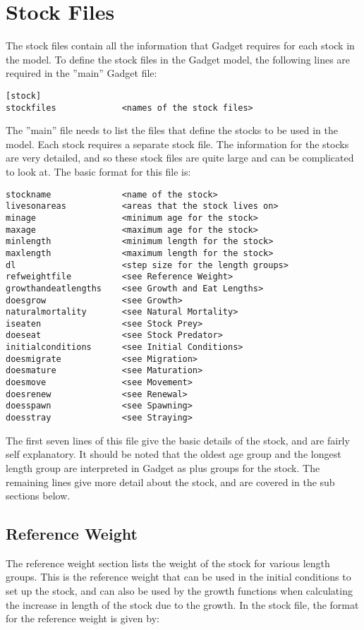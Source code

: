 \documentclass[10pt,twoside]{book}
\begin{document}
\chapter{Stock Files}\label{chap:stock}
The stock files contain all the information that Gadget requires for each stock in the model.  To define the stock files in the Gadget model, the following lines are required in the ''main'' Gadget file:

{\small\begin{verbatim}
[stock]
stockfiles             <names of the stock files>
\end{verbatim}}

The ''main'' file needs to list the files that define the stocks to be used in the model.  Each stock requires a separate stock file.  The information for the stocks are very detailed, and so these stock files are quite large and can be complicated to look at.  The basic format for this file is:

{\small\begin{verbatim}
stockname              <name of the stock>
livesonareas           <areas that the stock lives on>
minage                 <minimum age for the stock>
maxage                 <maximum age for the stock>
minlength              <minimum length for the stock>
maxlength              <maximum length for the stock>
dl                     <step size for the length groups>
refweightfile          <see Reference Weight>
growthandeatlengths    <see Growth and Eat Lengths>
doesgrow               <see Growth>
naturalmortality       <see Natural Mortality>
iseaten                <see Stock Prey>
doeseat                <see Stock Predator>
initialconditions      <see Initial Conditions>
doesmigrate            <see Migration>
doesmature             <see Maturation>
doesmove               <see Movement>
doesrenew              <see Renewal>
doesspawn              <see Spawning>
doesstray              <see Straying>
\end{verbatim}}

The first seven lines of this file give the basic details of the stock, and are fairly self explanatory.  It should be noted that the oldest age group and the longest length group are interpreted in Gadget as plus groups for the stock.  The remaining lines give more detail about the stock, and are covered in the sub sections below.

\section{Reference Weight}\label{sec:stockrefweight}
The reference weight section lists the weight of the stock for various length groups.  This is the reference weight that can be used in the initial conditions to set up the stock, and can also be used by the growth functions when calculating the increase in length of the stock due to the growth.  In the stock file, the format for the reference weight is given by:
\end{document}

